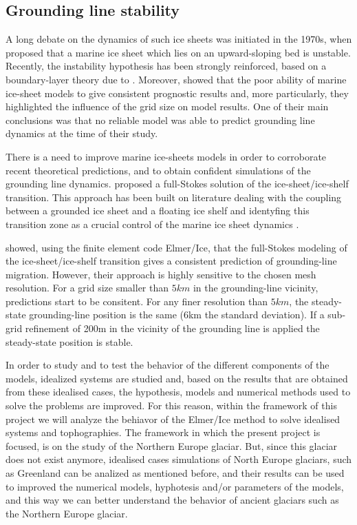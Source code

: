 \documentclass[a4paper,12pt]{article}
\begin{document}
\subsection{Grounding line stability}
A long debate on the dynamics of such ice sheets was initiated in the 1970s, when \cite{weertman1974stability} proposed that a marine ice sheet which lies on an upward-sloping bed is unstable. Recently, the instability hypothesis has been strongly reinforced, based on a boundary-layer theory due to \cite{schoof2007ice}. Moreover, \cite{vieli2005assessing} showed that the poor ability of marine ice-sheet models to give consistent prognostic results and, more particularly, they highlighted the influence of the grid size on model results. One of their main conclusions was that no reliable model was able to predict grounding line dynamics at the time of their study.

There is a need to improve marine ice-sheets models in order to corroborate recent theoretical predictions, and to obtain confident simulations of the grounding line dynamics. \cite{durand2009marine} proposed a full-Stokes solution of the ice-sheet/ice-shelf transition. This approach has been built on literature dealing with the coupling between a grounded ice sheet and a floating ice shelf and identyfing this transition zone as a crucial control of the marine ice sheet dynamics \cite[]{weertman1974stability,van1985response,chugunov1996modelling,hindmarsh1996stability,vieli2005assessing,schoof2007ice,schoof2007marine}.

\cite{durand2009full} showed, using the finite element code Elmer/Ice, that the full-Stokes modeling of the ice-sheet/ice-shelf transition gives a consistent prediction of grounding-line migration. However, their approach is highly sensitive to the chosen mesh resolution. For a grid size smaller than $5 km$ in the grounding-line vicinity, predictions start to be consitent. For any finer resolution than $5 km$, the steady-state grounding-line position is the same (6km the standard deviation). If a sub-grid refinement of 200m in the vicinity of the grounding line is applied the steady-state position is stable.

In order to study and to test the behavior of the different components of the models, idealized systems are studied and, based on the results that are obtained from these idealised cases, the hypothesis, models and numerical methods used to solve the problems are improved. For this reason, within the framework of this project we will analyze the behiavor of the Elmer/Ice method to solve idealised systems and tophographies. The framework in which the present project is focused, is on the study of the Northern Europe glaciar. But, since this glaciar does not exist anymore, idealised cases simulations of North Europe glaciars, such as Greenland can be analized as mentioned before, and their results can be used to improved the numerical models, hyphotesis and/or parameters of the models, and this way we can better understand the behavior of ancient glaciars such as the Northern Europe glaciar.
\end{document}
